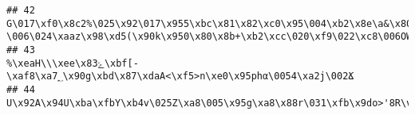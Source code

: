 \documentclass[
]{article}
\begin{document}
\begin{verbatim}
## 42                                                                                                                                                                                                                                                                                                                      G\017\xf0\x8c2%\025\x92\017\x955\xbc\x81\x82\xc0\x95\004\xb2\x8e\a&\x80?\006\024\xaaz\x98\xd5(\x90k\x950\x80\x8b+\xb2\xcc\020\xf9\022\xc8\006OW\b»\x8c\xd9\xf0\xd5O\x87D\x8bG\x90\xd5]\xc4OQi\xb7\xa7'(\xae\034\xde\xc3\005%96|w\xf6\xe9G\xf7\003Ґ\xe5%l{\x99c\xdc\024\xdd\xc1\xc1\x85\xbd\xfc\xa3\xd5T7\xce9\xb1Y\x9cu\xb5\xe7\xf8\x80\xef\024\xccТVz\xceAi2umu\xe3'\xd1M9\x8b~\x81\v\f\xe0\x8e\xc9w\xb5\xcev^n\033\xb3\x91]d\034\001\x9e\x97\xfa\xc6R\xd8}#m8}\xbf\xb2tJ]h\031\xfb\xd2\xc6\xdd\xe1qj)He\xc8\017\x97\xf6J\x97u\x9ae\x8d\xc3\xfb\xc1\xfex.\xa7\xa0\xd0\036\037\xdbjCo
## 43                                                                                                                                                                                                                                                                                                                                                                                                                                                                                                                                                                                                                                                                                                                                                                                                                        %\xeaH\\\xee\x83ۓ\xbf[-\xaf8\xa7؁\x90g\xbd\x87\xdaA<\xf5>n\xe0\x95phα\0054\xa2j\002Ճ
## 44                                                                                                                                                                                                                                                                                                                                                                                                                                                                                                                                                                                                                                                                                                                                                                                                      U\x92A\x94U\xba\xfbY\xb4v\025Z\xa8\005\x95g\xa8\x88r\031\xfb\x9do>'8R\vErf3B\xed\xd0\037[\xbc\xf9\033

\end{verbatim}
\end{document}

